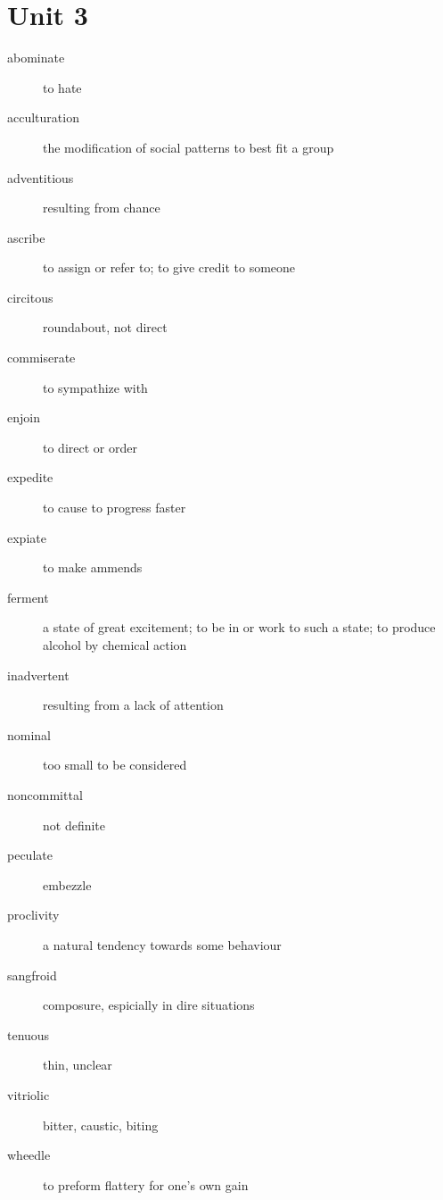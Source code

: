 \section{Unit 3}
\begin{description}
  \item[abominate] to hate
  \item[acculturation] the modification of social patterns to best fit a group
  \item[adventitious] resulting from chance
  \item[ascribe] to assign or refer to; to give credit to someone
  \item[circitous] roundabout, not direct
  \item[commiserate] to sympathize with
  \item[enjoin] to direct or order
  \item[expedite] to cause to progress faster
  \item[expiate] to make ammends
  \item[ferment] a state of great excitement; to be in or work to such a state;
    to produce alcohol by chemical action
  \item[inadvertent] resulting from a lack of attention
  \item[nominal] too small to be considered
  \item[noncommittal] not definite
  \item[peculate] embezzle
  \item[proclivity] a natural tendency towards some behaviour
  \item[sangfroid] composure, espicially in dire situations
  \item[tenuous] thin, unclear
  \item[vitriolic] bitter, caustic, biting
  \item[wheedle] to preform flattery for one's own gain
\end{description}

